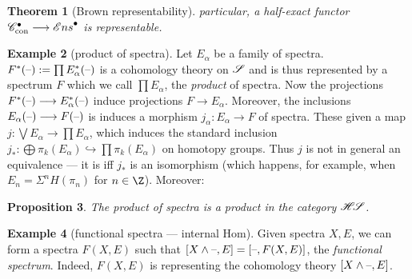 \documentclass[11pt]{article}
\theoremstyle{plain}
\newtheorem{thm}{Theorem}[subsection]
\newtheorem{prop}[thm]{Proposition}
\theoremstyle{definition}
\newtheorem{exmp}[thm]{Example}
\newcommand{\HS}{\scrH\!\scrS}
\newcommand{\CW}{\scrC}
\newcommand{\CWcon}{\CW_\textup{con}}
\begin{document}
{\begin{thm}[Brown representability]
particular, a half-exact functor $\CWcon^\bullet\to\Ens^\bullet$ is
representable.
\end{thm}
\begin{exmp}[product of spectra]
Let $E_\alpha$ be a family of spectra. $F^*(\textup{--}):=\prod E^*_\alpha(\textup{--})$ is
a cohomology theory on $\mathscr{S}$ and is thus represented by a spectrum $F$ which
we call $\prod E_\alpha$, the \emph{product} of spectra. Now the projections
$F^*(\textup{--})\longrightarrow E^*_\alpha(\textup{--})$ induce projections $F\to E_\alpha$. Moreover,
the inclusions $E_\alpha(\textup{--})\longrightarrow F(\textup{--})$ is induces a morphism
$j_\alpha:E_\alpha\to F$ of spectra. These given a map $j:\bigvee
E_\alpha\to\prod E_\alpha$, which induces the standard inclusion
$j_*:\bigoplus\pi_k(E_\alpha)\hookrightarrow \prod\pi_k(E_\alpha)$ on homotopy
groups. Thus $j$ is not in general an equivalence --- it is iff $j_*$ is an
isomorphism (which happens, for example, when $E_n=\Sigma^n H(\pi_n)$ for
$n\in\Z$). Moreover:
\end{exmp}
\begin{prop}
The product of spectra is a product in the category $\HS$.
\end{prop}
\begin{exmp}[functional spectra --- internal Hom]
Given spectra $X,E$, we can form a spectra $F(X,E)$ such that
$[X\wedge\textup{--},E]=[\textup{--},F(X,E)]$, the \emph{functional spectrum}. Indeed,
$F(X,E)$ is representing the cohomology theory $[X\wedge\textup{--},E]$.
\end{exmp}
}   %
\end{document}
